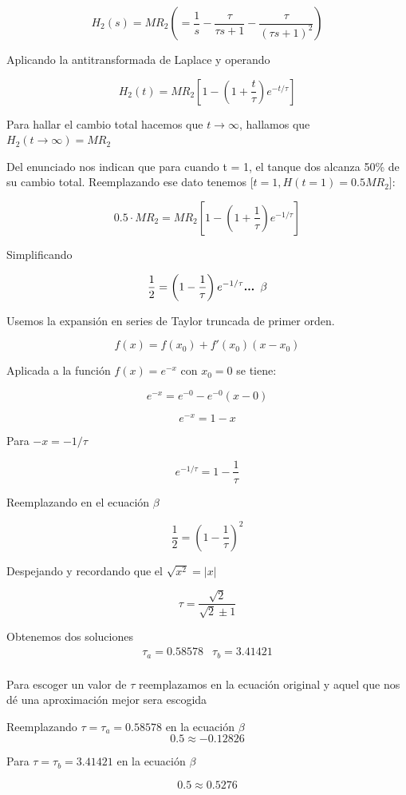 \documentclass[
  letterpaper,
  DIV=11,
  numbers=noendperiod]{scrreprt}
\begin{document}
\[
H_2(s)=MR_2\left(=\frac{1}{s}-\frac{\tau}{\tau s+1}-\frac{\tau}{(\tau s+1)^2}\right)
\]

Aplicando la antitransformada de Laplace y operando

\[
H_2(t) = MR_2\left[1-\left(1+\frac{t}{\tau}\right)e^{-t/\tau}\right]
\]

Para hallar el cambio total hacemos que \(t\to\infty\), hallamos que
\(H_2(t\to\infty)=MR_2\)

Del enunciado nos indican que para cuando t = 1, el tanque dos alcanza
50\% de su cambio total. Reemplazando ese dato tenemos
\(\big[t=1,H(t=1)=0.5MR_2\big]\):

\[
0.5\cdot MR_2 = MR_2\left[1-\left(1+\frac{1}{\tau}\right)e^{-1/\tau}\right]
\]

Simplificando

\[
\frac{1}{2}=\left(1-\frac{1}{\tau}\right)e^{-1/\tau}\space\space\space\space\textbf{... }\mathbf{\beta}
\]

Usemos la expansión en series de Taylor truncada de primer orden.

\[
f(x)=f(x_0)+f'(x_0)(x-x_0)
\]

Aplicada a la función \(f(x)=e^{-x}\) con \(x_0=0\) se tiene:

\[
e^{-x}=e^{-0}-e^{-0}(x-0)
\]

\[
e^{-x}=1-x
\]

Para \(-x=-1/\tau\)

\[
e^{-1/\tau}=1-\frac{1}{\tau}
\]

Reemplazando en el ecuación \(\beta\)

\[
\frac{1}{2}=\left(1-\frac{1}{\tau}\right)^2
\]

Despejando y recordando que el \(\sqrt{x^2}=|x|\)

\[
\tau=\frac{\sqrt{2}}{\sqrt{2} ± 1}
\]

Obtenemos dos soluciones \[
\begin{array}{ll}
\tau_a=0.58578 & \tau_b=3.41421\\
\end{array}
\]

Para escoger un valor de \(\tau\) reemplazamos en la ecuación original y
aquel que nos dé una aproximación mejor sera escogida

Reemplazando \(\tau=\tau_a=0.58578\) en la ecuación \(\beta\) \[
0.5\approx -0.12826
\]

Para \(\tau=\tau_b=3.41421\) en la ecuación \(\beta\)

\[
0.5\approx 0.5276
\]
\end{document}
